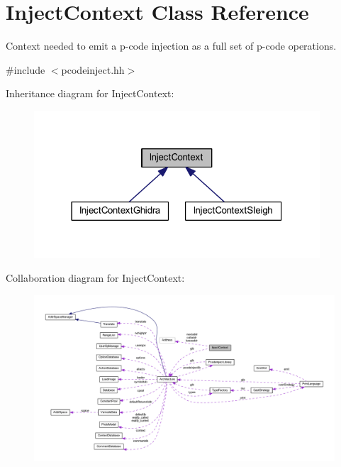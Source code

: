 \hypertarget{class_inject_context}{}\section{Inject\+Context Class Reference}
\label{class_inject_context}


Context needed to emit a p-\/code injection as a full set of p-\/code operations.  




{\ttfamily \#include $<$pcodeinject.\+hh$>$}



Inheritance diagram for Inject\+Context\+:
\nopagebreak
\begin{figure}[H]
\begin{center}
\leavevmode
\includegraphics[width=302pt]{class_inject_context__inherit__graph}
\end{center}
\end{figure}


Collaboration diagram for Inject\+Context\+:
\nopagebreak
\begin{figure}[H]
\begin{center}
\leavevmode
\includegraphics[width=350pt]{class_inject_context__coll__graph}
\end{center}
\end{figure}
